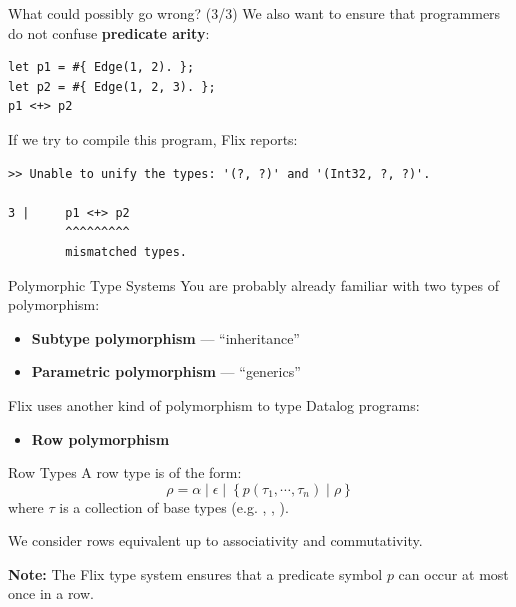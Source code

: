 \begin{frame}[fragile]{What could possibly go wrong? (3/3)}
We also want to ensure that programmers do not confuse \textbf{predicate arity}:

\begin{lstlisting}[language=flix, xleftmargin=0.8cm]
let p1 = #{ Edge(1, 2). };
let p2 = #{ Edge(1, 2, 3). };
p1 <+> p2
\end{lstlisting}

\pause

If we try to compile this program, Flix reports:

\begin{lstlisting}[language=flix, xleftmargin=0.8cm]
>> Unable to unify the types: '(?, ?)' and '(Int32, ?, ?)'.

3 |     p1 <+> p2
        ^^^^^^^^^
        mismatched types.

\end{lstlisting}
\end{frame}

\begin{frame}{Polymorphic Type Systems}
You are probably already familiar with two types of polymorphism:

\begin{itemize}
    \item \textbf{Subtype polymorphism} --- ``inheritance''
    \item \textbf{Parametric polymorphism} --- ``generics''
\end{itemize}

\pause

Flix uses another kind of polymorphism to type Datalog programs:

\begin{itemize}
    \item \textbf{Row polymorphism}
\end{itemize}
\end{frame}

\begin{frame}[fragile]{Row Types}
A row type is of the form:
$$
\rho = \alpha \mid \epsilon \mid \left \{ p (\tau_1, \cdots, \tau_n) \mid \rho \right \}
$$
where $\tau$ is a collection of base types (e.g. , , ).

\medskip

\pause

We consider rows equivalent up to associativity and commutativity. 

\medskip

\scriptsize
\textbf{Note:} The Flix type system ensures that a predicate symbol $p$ can
occur at most once in a row.
\end{frame}


